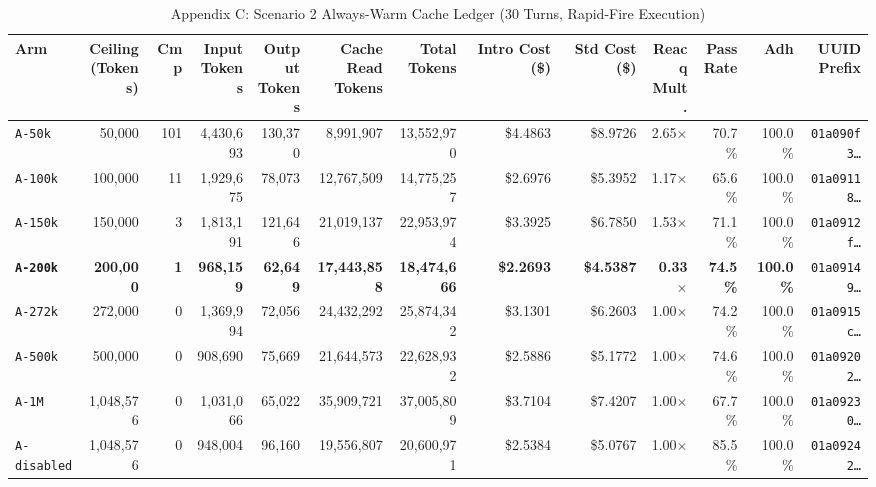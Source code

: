 \documentclass[10pt,twocolumn,a4paper]{article}
\begin{document}
\begin{table}[t]
\caption{Appendix C: Scenario 2 Always-Warm Cache Ledger (30 Turns, Rapid-Fire Execution)}
\label{tab:app_scenario2_ledger}
\centering
\scriptsize
\setlength{\tabcolsep}{2.2pt}
\begin{tabular}{@{}lrrrrrrrrrrrr@{}}
\toprule
\textbf{Arm} & \shortstack{\textbf{Ceiling}\\\textbf{(Tokens)}} & \textbf{Cmp} & \shortstack{\textbf{Input}\\\textbf{Tokens}} & \shortstack{\textbf{Output}\\\textbf{Tokens}} & \shortstack{\textbf{Cache Read}\\\textbf{Tokens}} & \shortstack{\textbf{Total}\\\textbf{Tokens}} & \shortstack{\textbf{Intro Cost}\\\textbf{(\$)}} & \shortstack{\textbf{Std Cost}\\\textbf{(\$)}} & \shortstack{\textbf{Reacq}\\\textbf{Mult.}} & \shortstack{\textbf{Pass}\\\textbf{Rate}} & \textbf{Adh} & \shortstack{\textbf{UUID}\\\textbf{Prefix}} \\
\midrule
\texttt{A-50k} & 50,000 & 101 & 4,430,693 & 130,370 & 8,991,907 & 13,552,970 & \$4.4863 & \$8.9726 & 2.65$\times$ & 70.7\% & 100.0\% & \texttt{01a090f3\dots} \\
\texttt{A-100k} & 100,000 & 11 & 1,929,675 & 78,073 & 12,767,509 & 14,775,257 & \$2.6976 & \$5.3952 & 1.17$\times$ & 65.6\% & 100.0\% & \texttt{01a09118\dots} \\
\texttt{A-150k} & 150,000 & 3 & 1,813,191 & 121,646 & 21,019,137 & 22,953,974 & \$3.3925 & \$6.7850 & 1.53$\times$ & 71.1\% & 100.0\% & \texttt{01a0912f\dots} \\
\textbf{\texttt{A-200k}} & \textbf{200,000} & \textbf{1} & \textbf{968,159} & \textbf{62,649} & \textbf{17,443,858} & \textbf{18,474,666} & \textbf{\$2.2693} & \textbf{\$4.5387} & \textbf{0.33$\times$} & \textbf{74.5\%} & \textbf{100.0\%} & \texttt{01a09149\dots} \\
\texttt{A-272k} & 272,000 & 0 & 1,369,994 & 72,056 & 24,432,292 & 25,874,342 & \$3.1301 & \$6.2603 & 1.00$\times$ & 74.2\% & 100.0\% & \texttt{01a0915c\dots} \\
\texttt{A-500k} & 500,000 & 0 & 908,690 & 75,669 & 21,644,573 & 22,628,932 & \$2.5886 & \$5.1772 & 1.00$\times$ & 74.6\% & 100.0\% & \texttt{01a09202\dots} \\
\texttt{A-1M} & 1,048,576 & 0 & 1,031,066 & 65,022 & 35,909,721 & 37,005,809 & \$3.7104 & \$7.4207 & 1.00$\times$ & 67.7\% & 100.0\% & \texttt{01a09230\dots} \\
\texttt{A-disabled} & 1,048,576 & 0 & 948,004 & 96,160 & 19,556,807 & 20,600,971 & \$2.5384 & \$5.0767 & 1.00$\times$ & 85.5\% & 100.0\% & \texttt{01a09242\dots} \\
\bottomrule
\end{tabular}
\end{table}
\end{document}
